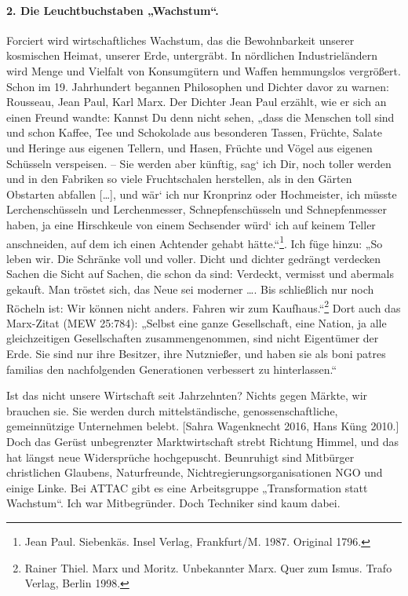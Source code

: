 \documentclass[12pt,a4paper]{article}
\begin{document}
\paragraph{2. Die Leuchtbuchstaben „Wachstum“.}
Forciert wird wirtschaftliches Wachstum, das die Bewohnbarkeit unserer
kosmischen Heimat, unserer Erde, untergräbt. In nördlichen Industrieländern
wird Menge und Vielfalt von Konsumgütern und Waffen hemmungslos vergrößert.
Schon im 19. Jahrhundert begannen Philosophen und Dichter davor zu warnen:
Rousseau, Jean Paul, Karl Marx. Der Dichter Jean Paul erzählt, wie er sich an
einen Freund wandte: Kannst Du denn nicht sehen, „dass die Menschen toll sind
und schon Kaffee, Tee und Schokolade aus besonderen Tassen, Früchte, Salate
und Heringe aus eigenen Tellern, und Hasen, Früchte und Vögel aus eigenen
Schüsseln verspeisen. – Sie werden aber künftig, sag‘ ich Dir, noch toller
werden und in den Fabriken so viele Fruchtschalen herstellen, als in den
Gärten Obstarten abfallen [\ldots], und wär‘ ich nur Kronprinz oder
Hochmeister, ich müsste Lerchenschüsseln und Lerchenmesser, Schnepfenschüsseln
und Schnepfenmesser haben, ja eine Hirschkeule von einem Sechsender würd‘ ich
auf keinem Teller anschneiden, auf dem ich einen Achtender gehabt
hätte.“\footnote{Jean Paul. Siebenkäs. Insel Verlag, Frankfurt/M. 1987.
  Original 1796.}. Ich füge hinzu: „So leben wir. Die Schränke voll und
voller. Dicht und dichter gedrängt verdecken Sachen die Sicht auf Sachen, die
schon da sind: Verdeckt, vermisst und abermals gekauft. Man tröstet sich, das
Neue sei moderner \ldots.  Bis schließlich nur noch Röcheln ist: Wir können
nicht anders. Fahren wir zum Kaufhaus.“\footnote{Rainer Thiel. Marx und
  Moritz. Unbekannter Marx. Quer zum Ismus. Trafo Verlag, Berlin 1998.} Dort
auch das Marx-Zitat (MEW 25:784): „Selbst eine ganze Gesellschaft, eine
Nation, ja alle gleichzeitigen Gesellschaften zusammengenommen, sind nicht
Eigentümer der Erde. Sie sind nur ihre Besitzer, ihre Nutznießer, und haben
sie als boni patres familias den nachfolgenden Generationen verbessert zu
hinterlassen.“

Ist das nicht unsere Wirtschaft seit Jahrzehnten? Nichts gegen Märkte, wir
brauchen sie. Sie werden durch mittelständische, genossenschaftliche,
gemeinnützige Unternehmen belebt. [Sahra Wagenknecht 2016, Hans Küng 2010.]
Doch das Gerüst unbegrenzter Marktwirtschaft strebt Richtung Himmel, und das
hat längst neue Widersprüche hochgepuscht. Beunruhigt sind Mitbürger
christlichen Glaubens, Naturfreunde, Nichtregierungsorganisationen NGO und
einige Linke. Bei ATTAC gibt es eine Arbeitsgruppe „Transformation statt
Wachstum“. Ich war Mitbegründer. Doch Techniker sind kaum dabei.
\end{document}
